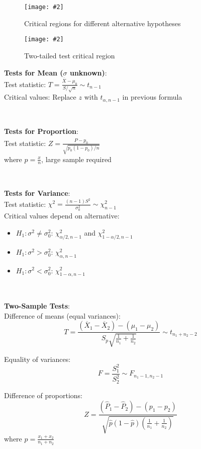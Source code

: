 \documentclass{article}
\def\imagewidth{0.9}
\newenvironment{cheatformula}[1][Title]{
    \begin{minipage}{\linewidth}
    \textbf{#1}:\\
}{
    \end{minipage}\\[2ex]
}
\newcommand{\cheatimage}[4][\imagewidth]{
    \begin{figure}[H]
        \centering
        \texttt{[image: \#2]}
        \caption{#3}
        \label{#4}
    \end{figure}
}
\begin{document}
\begin{multicols*}{2}
\cheatimage[1.0]{critical_regions_alternatives.png}{Critical regions for different alternative hypotheses}{fig:critical-regions}

\cheatimage[1.0]{two_tailed_test.png}{Two-tailed test critical region}{fig:two-tailed-test}

\begin{cheatformula}[Tests for Mean ($\sigma$ unknown)]
    Test statistic: $T = \frac{\overline{X} - \mu_0}{S/\sqrt{n}} \sim t_{n-1}$\\
    
    Critical values: Replace $z$ with $t_{\alpha,n-1}$ in previous formula
\end{cheatformula}

\begin{cheatformula}[Tests for Proportion]
    Test statistic: $Z = \frac{\hat{P} - p_0}{\sqrt{p_0(1-p_0)/n}}$\\
    where $\hat{p} = \frac{x}{n}$, large sample required
\end{cheatformula}

\begin{cheatformula}[Tests for Variance]
    Test statistic: $\chi^2 = \frac{(n-1)S^2}{\sigma_0^2} \sim \chi^2_{n-1}$\\
    
    Critical values depend on alternative:
    \begin{itemize}
        \item $H_1: \sigma^2 \neq \sigma_0^2$: $\chi^2_{\alpha/2,n-1}$ and $\chi^2_{1-\alpha/2,n-1}$
        \item $H_1: \sigma^2 > \sigma_0^2$: $\chi^2_{\alpha,n-1}$
        \item $H_1: \sigma^2 < \sigma_0^2$: $\chi^2_{1-\alpha,n-1}$
    \end{itemize}
\end{cheatformula}

\begin{cheatformula}[Two-Sample Tests]
    Difference of means (equal variances):
    $$T = \frac{(\overline{X}_1 - \overline{X}_2) - (\mu_1 - \mu_2)}{S_p\sqrt{\frac{1}{n_1} + \frac{1}{n_2}}} \sim t_{n_1+n_2-2}$$
    
    Equality of variances:
    $$F = \frac{S_1^2}{S_2^2} \sim F_{n_1-1, n_2-1}$$
    
    Difference of proportions:
    $$Z = \frac{(\hat{P}_1 - \hat{P}_2) - (p_1 - p_2)}{\sqrt{\hat{p}(1-\hat{p})(\frac{1}{n_1} + \frac{1}{n_2})}}$$
    where $\hat{p} = \frac{x_1 + x_2}{n_1 + n_2}$
\end{cheatformula}


\end{multicols*}
\end{document}
